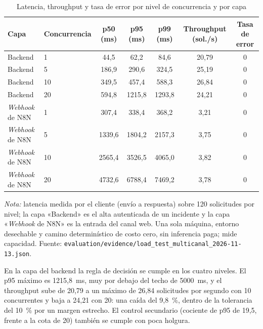 \begin{table}[htbp]
\centering
\caption{Latencia, throughput y tasa de error por nivel de concurrencia y por capa}
\label{tab:carga-multicanal}
\footnotesize
\begin{tabular}{@{}llccccc@{}}
\toprule
\textbf{Capa} & \textbf{Concurrencia} & \textbf{p50 (ms)} & \textbf{p95 (ms)} & \textbf{p99 (ms)} & \textbf{Throughput (sol./s)} & \textbf{Tasa de error} \\
\midrule
Backend & 1 & 44,5 & 62,2 & 84,6 & 20,79 & 0 \\
Backend & 5 & 186,9 & 290,6 & 324,5 & 25,19 & 0 \\
Backend & 10 & 349,5 & 457,4 & 588,3 & 26,84 & 0 \\
Backend & 20 & 594,8 & 1215,8 & 1293,8 & 24,21 & 0 \\
\emph{Webhook} de N8N & 1 & 307,4 & 338,4 & 368,2 & 3,21 & 0 \\
\emph{Webhook} de N8N & 5 & 1339,6 & 1804,2 & 2157,3 & 3,75 & 0 \\
\emph{Webhook} de N8N & 10 & 2565,4 & 3526,5 & 4065,0 & 3,82 & 0 \\
\emph{Webhook} de N8N & 20 & 4732,6 & 6788,4 & 7469,2 & 3,78 & 0 \\
\bottomrule
\end{tabular}
\par\smallskip
{\footnotesize\textit{Nota:} latencia medida por el cliente (envío a respuesta) sobre 120 solicitudes por nivel; la capa «Backend» es el alta autenticada de un incidente y la capa «\emph{Webhook} de N8N» es la entrada del canal web. Una sola máquina, entorno desechable y camino determinístico de costo cero, sin inferencia paga; mide capacidad. Fuente: \texttt{evaluation/evidence/load\_test\_multicanal\_2026-11-13.json}.}
\end{table}

En la capa del backend la regla de decisión se cumple en los cuatro niveles. El p95 máximo es 1215,8~ms, muy por debajo del techo de 5000~ms, y el throughput sube de 20,79 a un máximo de 26,84 solicitudes por segundo con 10 concurrentes y baja a 24,21 con 20: una caída del 9,8~\%, dentro de la tolerancia del 10~\% por un margen estrecho. El control secundario (cociente de p95 de 19,5, frente a la cota de 20) también se cumple con poca holgura.

